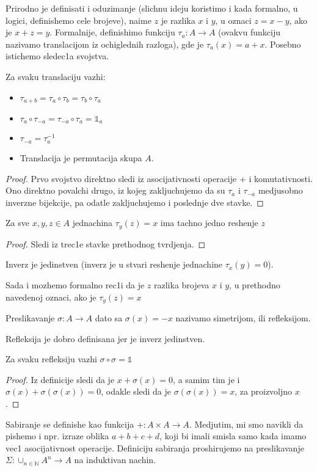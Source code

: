 \documentclass[../main.tex]{subfiles}
\begin{document}
    Prirodno je definisati i oduzimanje (slichnu ideju koristimo i kada formalno, u logici, definishemo cele brojeve), naime $z$ je razlika $x$ i $y$, u oznaci $z=x-y$, ako je $x+z=y$. Formalnije, definishimo funkciju $\tau_a : A \to A$ (ovakvu funkciju nazivamo translacijom iz ochiglednih razloga), gde je $\tau_a(x)=a+x$. Posebno istichemo sledec1a svojstva.
    {\tvr Za svaku translaciju vazhi:
        \begin{itemize}
    \item $\tau_{a+b}=\tau_a\circ\tau_b=\tau_b\circ\tau_a$
\item $\tau_a\circ\tau_{-a}=\tau_{-a}\circ\tau_a=\mathds{1}_a$
\item $\tau_{-a}=\tau_a^{-1}$
\item Translacija je permutacija skupa $A$.\end{itemize}}
    \begin{proof}
        Prvo svojstvo direktno sledi iz asocijativnosti operacije $+$ i komutativnosti. Ono direktno povalchi drugo, iz kojeg zakljuchujemo da su $\tau_a$ i $\tau_{-a}$ medjusobno inverzne bijekcije, pa odatle zakljuchujemo i poslednje dve stavke.\end{proof}

    {\tvr Za sve $x,y,z\in A$ jednachina $\tau_y(z)=x$ ima tachno jedno reshenje $z$ }
    \begin{proof}
    Sledi iz trec1e stavke prethodnog tvrdjenja.     \end{proof}

    {\posl Inverz je jedinstven (inverz je u stvari reshenje jednachine $\tau_x(y)=0$).} 

    Sada i mozhemo formalno rec1i da je $z$ razlika brojeva $x$ i $y$, u prethodno navedenoj oznaci, ako je $\tau_{y}(z)=x$

    {\de Preslikavanje $\sigma: A \to A$ dato sa $\sigma(x)=-x$ nazivamo simetrijom, ili refleksijom}.

    \nap Refleksija je dobro definisana jer je inverz jedinstven.

    {\tvr Za svaku refleksiju vazhi $\sigma\circ\sigma=\mathds{1}$}

    \begin{proof} 
    Iz definicije sledi da je $x+\sigma(x)=0$, a samim tim je i $\sigma(x)+\sigma(\sigma(x))=0$, odakle sledi da je $\sigma(\sigma(x))=x$, za proizvoljno $x$.    \end{proof}

    Sabiranje se definishe kao funkcija $+:A \times A \to A$. Medjutim, mi smo navikli da pishemo i npr. izraze oblika $a+b+c+d$, koji bi imali smisla samo kada imamo vec1 asocijativnost operacije. Definiciju sabiranja proshirujemo na preslikavanje $\Sigma : \cup_{n\in \mathbb{N}} A^{n} \to A$ na induktivan nachin.
\end{document}
